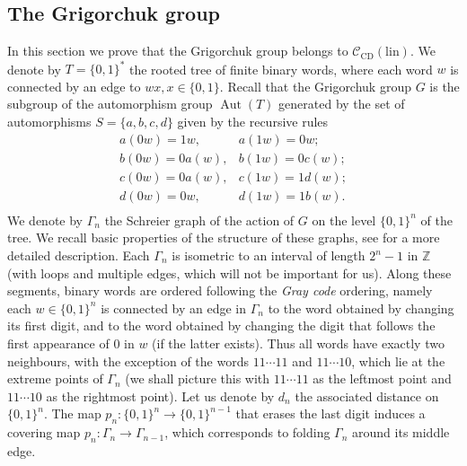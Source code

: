 \documentclass[11pt]{amsart}
\newcommand{\Z}{\ensuremath{\mathbb{Z}}}%
\newcommand{\aut}{\ensuremath{\operatorname{Aut}}}%
\newcommand{\Class}{\ensuremath{\mathcal{C}}}
\theoremstyle{definition}
\theoremstyle{plain}
\theoremstyle{remark}
\begin{document}
\subsection{The Grigorchuk group} \label{subsec-Grigorchuk-group}


In this section we prove that the Grigorchuk group belongs to $\Class_{\mathrm{CD}}(\mathrm{lin})$. 
We denote by $T=\{0, 1\}^*$ the rooted tree of finite binary words, where each word $w$ is connected by an edge to $wx, x\in \{0, 1\}$. Recall that the Grigorchuk group $G$ is the subgroup of the automorphism group $\aut(T)$ generated by the set of automorphisms $S=\{a, b, c, d\}$ given by the recursive rules
\[\begin{array}{lr}
a(0w)=1w, & a(1w)=0w;\\
b(0w)=0a(w), & b(1w)=0c(w);\\
c(0w)=0a(w), & c(1w)=1d(w);\\
d(0w)=0w, &d(1w)=1b(w).\\
\end{array}\]
We denote by $\Gamma_n$ the Schreier graph of the action of $G$ on the level $\{0, 1\}^n$ of the tree. We recall basic properties of the structure of these graphs, see  \cite{Bar-Gri-Hecke} for a more detailed description. Each $\Gamma_n$ is isometric to an interval of length $2^n-1$ in $\Z$ (with loops and multiple edges, which will not be important for us). Along these segments, binary words are ordered following the \emph{Gray code} ordering, namely each $w\in \{0, 1\}^n$ is connected by an edge in $\Gamma_n$ to the word obtained by changing its first digit, and to the word obtained by changing the digit that follows the first appearance of $0$ in $w$ (if the latter exists).  Thus all words have exactly two neighbours, with the exception of the words $11\cdots11$ and $11\cdots 10$, which lie at the extreme points of $\Gamma_n$ (we shall picture this with $11\cdots 11$ as the leftmost point and $11\cdots 10$ as the rightmost point). Let us denote by $d_n$ the associated distance on $\{0, 1\}^n$.
The map $p_n\colon \{0, 1\}^n\to \{0, 1\}^{n-1}$ that erases the last digit induces a covering map $p_n\colon \Gamma_n\to \Gamma_{n-1}$, which corresponds to folding $\Gamma_n$ around its middle edge.
 
\end{document}
